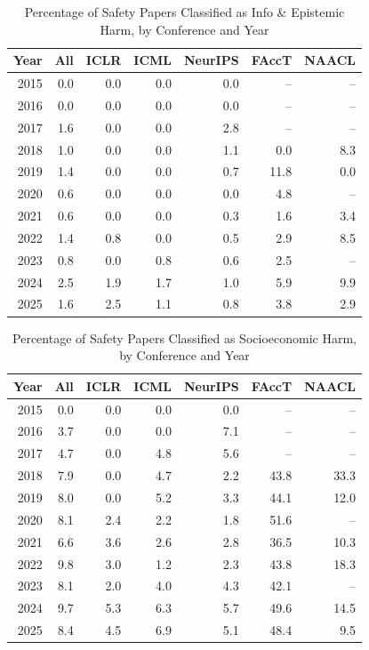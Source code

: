 \begin{table}[ht]
\centering
\caption{Percentage of Safety Papers Classified as Info \& Epistemic Harm, by Conference and Year} 
\label{tab:summary_info_epistemic_harm}
\begin{tabular}{rrrrrrr}
  \hline
Year & All & ICLR & ICML & NeurIPS & FAccT & NAACL \\ 
  \hline
2015 & 0.0 & 0.0 & 0.0 & 0.0 & -- & -- \\ 
  2016 & 0.0 & 0.0 & 0.0 & 0.0 & -- & -- \\ 
  2017 & 1.6 & 0.0 & 0.0 & 2.8 & -- & -- \\ 
  2018 & 1.0 & 0.0 & 0.0 & 1.1 & 0.0 & 8.3 \\ 
  2019 & 1.4 & 0.0 & 0.0 & 0.7 & 11.8 & 0.0 \\ 
  2020 & 0.6 & 0.0 & 0.0 & 0.0 & 4.8 & -- \\ 
  2021 & 0.6 & 0.0 & 0.0 & 0.3 & 1.6 & 3.4 \\ 
  2022 & 1.4 & 0.8 & 0.0 & 0.5 & 2.9 & 8.5 \\ 
  2023 & 0.8 & 0.0 & 0.8 & 0.6 & 2.5 & -- \\ 
  2024 & 2.5 & 1.9 & 1.7 & 1.0 & 5.9 & 9.9 \\ 
  2025 & 1.6 & 2.5 & 1.1 & 0.8 & 3.8 & 2.9 \\ 
   \hline
\end{tabular}
\end{table}
\begin{table}[ht]
\centering
\caption{Percentage of Safety Papers Classified as Socioeconomic Harm, by Conference and Year} 
\label{tab:summary_socioec_harm}
\begin{tabular}{rrrrrrr}
  \hline
Year & All & ICLR & ICML & NeurIPS & FAccT & NAACL \\ 
  \hline
2015 & 0.0 & 0.0 & 0.0 & 0.0 & -- & -- \\ 
  2016 & 3.7 & 0.0 & 0.0 & 7.1 & -- & -- \\ 
  2017 & 4.7 & 0.0 & 4.8 & 5.6 & -- & -- \\ 
  2018 & 7.9 & 0.0 & 4.7 & 2.2 & 43.8 & 33.3 \\ 
  2019 & 8.0 & 0.0 & 5.2 & 3.3 & 44.1 & 12.0 \\ 
  2020 & 8.1 & 2.4 & 2.2 & 1.8 & 51.6 & -- \\ 
  2021 & 6.6 & 3.6 & 2.6 & 2.8 & 36.5 & 10.3 \\ 
  2022 & 9.8 & 3.0 & 1.2 & 2.3 & 43.8 & 18.3 \\ 
  2023 & 8.1 & 2.0 & 4.0 & 4.3 & 42.1 & -- \\ 
  2024 & 9.7 & 5.3 & 6.3 & 5.7 & 49.6 & 14.5 \\ 
  2025 & 8.4 & 4.5 & 6.9 & 5.1 & 48.4 & 9.5 \\ 
   \hline
\end{tabular}
\end{table}
